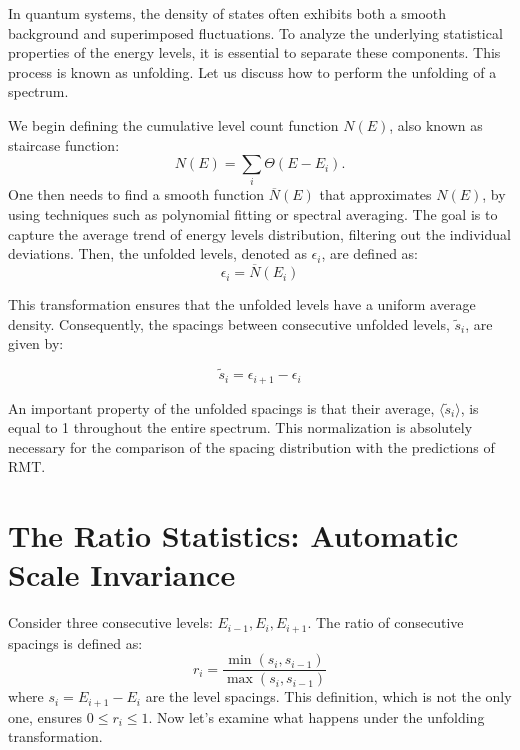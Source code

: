 \documentclass[10pt]{article}
\begin{document}
In quantum systems, the density of states often exhibits both a smooth 
background and superimposed fluctuations. To analyze the underlying 
statistical properties of the energy levels, it is essential to separate 
these components. This process is known as unfolding. Let us discuss how 
to perform the unfolding of a spectrum.

We begin defining the cumulative level count function $N(E)$, also known as
staircase function:
\begin{equation}
N(E) = \sum_i \Theta(E - E_i).
\end{equation}
One then needs to find a smooth function $\overline{N}(E)$ that approximates 
$N(E)$, by using techniques such as polynomial fitting or spectral 
averaging. The goal is to capture the average trend of energy levels 
distribution, filtering out the individual deviations.
Then, the unfolded levels, denoted as $\epsilon_i$, are 
defined as:
\begin{equation}
\epsilon_i = \overline{N}(E_i)
\end{equation}

This transformation ensures that the unfolded levels have a uniform 
average density. Consequently, the spacings between consecutive 
unfolded levels, $\tilde{s}_i$, are given by:

\begin{equation}
\tilde{s}_i = \epsilon_{i+1} - \epsilon_i
\end{equation}

An important property of the unfolded spacings is that their average, 
$\langle \tilde{s}_i \rangle$, is equal to 1 throughout the entire 
spectrum. This normalization is absolutely necessary for the comparison of the 
spacing distribution with the predictions of RMT.

\section{The Ratio Statistics: Automatic Scale Invariance}

Consider three consecutive levels: $E_{i-1}, E_i, E_{i+1}$. The ratio 
of consecutive spacings is defined as:
%
\begin{equation}
r_i = \frac{\min(s_i, s_{i-1})}{\max(s_i, s_{i-1})}
\end{equation}
%
where $s_i = E_{i+1} - E_i$ are the level spacings. This definition, which 
is not the only one, ensures $0 \leq r_i \leq 1$.
Now let's examine what happens under the unfolding transformation.
\end{document}
